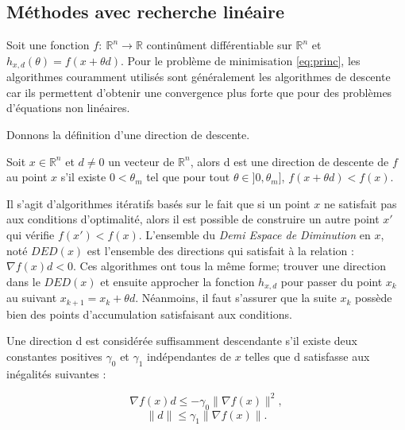 \subsection{M\'ethodes avec recherche lin\'eaire}
Soit une fonction $f:\ \mathbb{R}^n \rightarrow \mathbb{R}$ continûment diff\'erentiable sur $\mathbb{R}^n$ et \\
$h_{x,d}(\theta)=f(x+\theta d)$.
Pour le probl\`eme de minimisation \eqref{eq:princ}, les algorithmes couramment utilis\'es sont g\'en\'eralement les algorithmes de 
descente car ils permettent d'obtenir une convergence plus forte que pour des probl\`emes d'\'equations
non lin\'eaires.





 Donnons la d\'efinition d'une direction de descente.

\begin{frdefinition}
\label{def:1}
Soit $x \in \mathbb{R}^n$ et $d \neq 0$ un vecteur de $\mathbb{R}^n$, alors d est une direction de
descente de $f$ au point $x$ s'il existe $0<\theta_m$ tel que pour tout $\theta \in ]0,\theta_m]$,
$f(x+\theta d)<f(x)$. \\
\end{frdefinition}
%
Il s'agit d'algorithmes it\'eratifs bas\'es sur le fait que si un point $x$ ne satisfait pas aux conditions d'optimalit\'e, alors il est 
possible de construire un autre point $x'$ qui v\'erifie $f(x')<f(x)$.
L'ensemble du {\it Demi Espace de Diminution} en $x$, not\'e $DED(x)$ est l'ensemble des directions qui satisfait \`a la relation :
$\nabla f(x)d<0$. Ces algorithmes ont tous la même forme;  trouver une direction dans le $DED(x)$ et 
ensuite approcher la fonction $h_{x,d}$ pour passer du point $x_k$ au suivant $x_{k+1}=x_k+\theta d$. N\'eanmoins, il faut s'assurer que la suite ${x_k}$
poss\`ede bien des points d'accumulation satisfaisant aux conditions.


\begin{frdefinition}
\label{def:2}
 Une direction d est consid\'er\'ee suffisamment descendante s'il existe deux constantes positives $\gamma_0$ et $\gamma_1$ 
 ind\'ependantes de $x$ telles que d satisfasse aux in\'egalit\'es suivantes : 

\begin{equation}  %
\label{equ:1}
\nabla f(x)d \leq -\gamma_0 \lVert \nabla f(x) \rVert^2 ,
\end{equation}
\begin{equation}
\label{equ:2}
\lVert d \rVert \leq \gamma_1 \lVert \nabla f(x) \rVert.
\end{equation}

\end{frdefinition}






